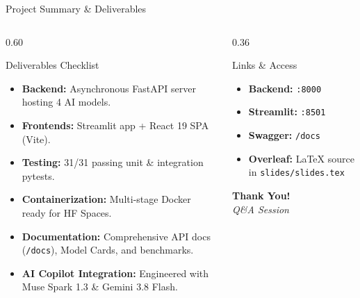 \documentclass[aspectratio=169, 10pt]{beamer}
\begin{document}
\begin{frame}{Project Summary \& Deliverables}
  \begin{columns}[T]
    \begin{column}{0.60\textwidth}
      \begin{block}{Deliverables Checklist}
        \small
        \begin{itemize}
          \item[\checkmark] \textbf{Backend:} Asynchronous FastAPI server hosting 4 AI models.
          \item[\checkmark] \textbf{Frontends:} Streamlit app + React 19 SPA (Vite).
          \item[\checkmark] \textbf{Testing:} 31/31 passing unit \& integration pytests.
          \item[\checkmark] \textbf{Containerization:} Multi-stage Docker ready for HF Spaces.
          \item[\checkmark] \textbf{Documentation:} Comprehensive API docs (\texttt{/docs}), Model Cards, and benchmarks.
          \item[\checkmark] \textbf{AI Copilot Integration:} Engineered with Muse Spark 1.3 \& Gemini 3.8 Flash.
        \end{itemize}
      \end{block}
    \end{column}

    \begin{column}{0.36\textwidth}
      \begin{exampleblock}{Links \& Access}
        \small
        \begin{itemize}
          \item \textbf{Backend:} \texttt{:8000}
          \item \textbf{Streamlit:} \texttt{:8501}
          \item \textbf{Swagger:} \texttt{/docs}
          \item \textbf{Overleaf:} LaTeX source in \texttt{slides/slides.tex}
        \end{itemize}
      \end{exampleblock}

      \vspace{0.3cm}
      \centering
      {\Large\textbf{Thank You!}} \\
      \vspace{0.1cm}
      \textit{Q\&A Session}
    \end{column}
  \end{columns}
\end{frame}
\end{document}
